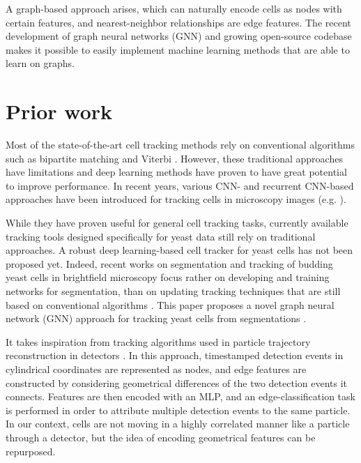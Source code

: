 \documentclass[10pt,conference,compsocconf,a4paper]{IEEEtran}
\begin{document}
	A graph-based approach arises, which can naturally encode cells as nodes with certain features, and nearest-neighbor relationships are edge features. The recent development of graph neural networks (GNN) \cite{zhou_graph_2021} and growing open-source codebase \cite{paszke_pytorch_2019, fey_fast_2019} makes it possible to easily implement machine learning methods that are able to learn on graphs.


\section{Prior work}
	
	Most  of the state-of-the-art cell tracking methods rely on conventional algorithms such as bipartite matching \cite{bipartite} and  Viterbi \cite{viterbi} \cite{viterbi2}.  However,  these traditional  approaches have limitations and deep  learning  methods  have  proven to have great potential  to  improve performance. In recent years, various CNN- and  recurrent  CNN-based  approaches have been introduced for tracking cells in microscopy images (e.g. \cite{he,delta,payer,hayashida,moen}).

    While they have proven useful for general cell tracking tasks, currently available tracking tools designed specifically for yeast data still rely on traditional approaches. A robust deep learning-based cell tracker for yeast cells has not been proposed yet. Indeed, recent works on segmentation and tracking of budding yeast cells in brightfield microscopy focus rather on developing and training  networks for segmentation, than on updating tracking techniques that are still based on conventional algorithms \cite{dietler_convolutional_2020,yeastnet,kruitbosch}.
    This paper proposes a novel graph neural network (GNN) approach for tracking yeast cells from segmentations \cite{dietler_convolutional_2020, Stringer2020.02.02.931238}.
    
	
	It takes inspiration from tracking algorithms used in particle trajectory reconstruction in detectors \cite{dezoort_charged_2021}.
	In this approach, timestamped detection events in cylindrical coordinates are represented as nodes, and edge features are constructed by considering geometrical differences of the two detection events it connects. Features are then encoded with an MLP, and an edge-classification task is performed in order to attribute multiple detection events to the same particle. In our context, cells are not moving in a highly correlated manner like a particle through a detector, but the idea of encoding geometrical features can be repurposed.
\end{document}
